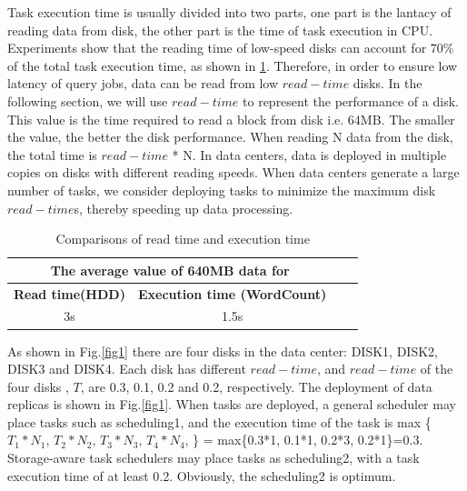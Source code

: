 \documentclass[conference]{IEEEtran}
\begin{document}
Task execution time is usually divided into two parts, one part is the lantacy of reading data from disk, the other part is the time of task execution in CPU. Experiments show that the reading time of low-speed disks can account for 70\% of the total task execution time, as shown in \ref{tab1}. Therefore, in order to ensure low latency of query jobs, data can be read from low $read-time$ disks. In the following section, we will use $read-time$ to represent the performance of a disk. This value is the time required to read a block from disk i.e. 64MB. The smaller the value, the better the disk performance. When reading N data from the disk, the total time is $read-time$ * N. In data centers, data is deployed in multiple copies on disks with different reading speeds. When data centers generate a large number of tasks, we consider deploying tasks to minimize the maximum disk $read-time$s,  thereby speeding up data processing.%

\begin{table}[htbp]
	\caption{Comparisons of read time and execution time}
	\begin{center}
		\begin{tabular}{|c|c|c|c|}
			\hline
			\multicolumn{2}{|c|}{\textbf{The average value of 640MB data for  }} \\
			\hline
			\textbf{Read time(HDD)}& \textbf{Execution time (WordCount)}\\
			\hline
			3s & 1.5s  \\
			\hline
		\end{tabular}
		\label{tab1}
	\end{center}
\end{table}

As shown in Fig.\ref{fig1} there are four disks in the data center: DISK1, DISK2, DISK3 and DISK4. Each disk has different $read-time$, and $read-time$ of the four disks , $T$, are 0.3, 0.1, 0.2 and 0.2, respectively. The deployment of data replicas is shown in Fig.\ref{fig1}. When tasks are deployed, a general scheduler may place tasks such as scheduling1, and the execution time of the task is max \{$T_1 * N_1$, $T_2 * N_2$, $T_3 * N_3$,  $T_4 * N_4$, \} = max\{0.3*1, 0.1*1, 0.2*3, 0.2*1\}=0.3. Storage-aware task schedulers may place tasks as scheduling2, with a task execution time of at least 0.2. Obviously, the scheduling2 is optimum.
\end{document}
